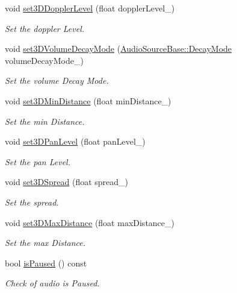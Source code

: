 \begin{DoxyCompactItemize}
void \hyperlink{class_i_dream_sky_1_1_audio_source_base_a20381f23a8f187123e8815a9deafb4b9}{set3\+D\+Doppler\+Level} (float doppler\+Level\+\_\+)
\begin{DoxyCompactList}\small\item\em Set the doppler Level. \end{DoxyCompactList}\item 
void \hyperlink{class_i_dream_sky_1_1_audio_source_base_a437afc1a3cb83b3c8780f895cf9673bf}{set3\+D\+Volume\+Decay\+Mode} (\hyperlink{class_i_dream_sky_1_1_audio_source_base_a037f40be30e9c7a8788f3caefe38e252}{Audio\+Source\+Base\+::\+Decay\+Mode} volume\+Decay\+Mode\+\_\+)
\begin{DoxyCompactList}\small\item\em Set the volume Decay Mode. \end{DoxyCompactList}\item 
void \hyperlink{class_i_dream_sky_1_1_audio_source_base_a43cbb2cf46f47a800924a8017e910f88}{set3\+D\+Min\+Distance} (float min\+Distance\+\_\+)
\begin{DoxyCompactList}\small\item\em Set the min Distance. \end{DoxyCompactList}\item 
void \hyperlink{class_i_dream_sky_1_1_audio_source_base_a696c65f2d5d7c0924e74689859d95082}{set3\+D\+Pan\+Level} (float pan\+Level\+\_\+)
\begin{DoxyCompactList}\small\item\em Set the pan Level. \end{DoxyCompactList}\item 
void \hyperlink{class_i_dream_sky_1_1_audio_source_base_a34d62e931fbeeda21cc96d4a75107012}{set3\+D\+Spread} (float spread\+\_\+)
\begin{DoxyCompactList}\small\item\em Set the spread. \end{DoxyCompactList}\item 
void \hyperlink{class_i_dream_sky_1_1_audio_source_base_a46615a70206de19f97f07c6d56542c09}{set3\+D\+Max\+Distance} (float max\+Distance\+\_\+)
\begin{DoxyCompactList}\small\item\em Set the max Distance. \end{DoxyCompactList}\item 
bool \hyperlink{class_i_dream_sky_1_1_audio_source_base_aea802686d2ca8cc4491cebbf165d1f81}{is\+Paused} () const 
\begin{DoxyCompactList}\small\item\em Check of audio is Paused. \end{DoxyCompactList}\item 

\end{DoxyCompactItemize}
